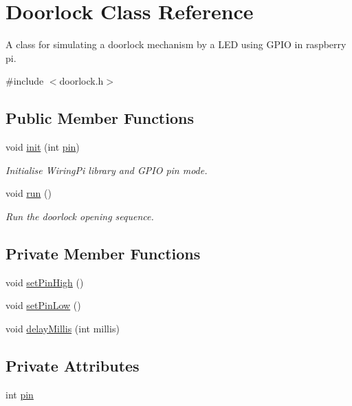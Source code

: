 \hypertarget{class_doorlock}{}\section{Doorlock Class Reference}
\label{class_doorlock}


A class for simulating a doorlock mechanism by a L\+E\+D using G\+P\+I\+O in raspberry pi.  




{\ttfamily \#include $<$doorlock.\+h$>$}

\subsection*{Public Member Functions}
\begin{DoxyCompactItemize}
\item 
void \hyperlink{class_doorlock_afcbd63621433c6086f0356bd2f94b47d}{init} (int \hyperlink{class_doorlock_a47bd9a55d9497c8276026ed0f6ed1bf5}{pin})
\begin{DoxyCompactList}\small\item\em Initialise Wiring\+Pi library and G\+P\+I\+O pin mode. \end{DoxyCompactList}\item 
void \hyperlink{class_doorlock_a673692b6523ede367cb976a345c7abf8}{run} ()
\begin{DoxyCompactList}\small\item\em Run the doorlock opening sequence. \end{DoxyCompactList}\end{DoxyCompactItemize}
\subsection*{Private Member Functions}
\begin{DoxyCompactItemize}
\item 
void \hyperlink{class_doorlock_a03ac589bab28ea38e17bbe0cfdc3cedd}{set\+Pin\+High} ()
\item 
void \hyperlink{class_doorlock_a7479d484eff1b1122c4f9e92f51597d1}{set\+Pin\+Low} ()
\item 
void \hyperlink{class_doorlock_aef174dcae75e99ddcf7c479bc65db2d1}{delay\+Millis} (int millis)
\end{DoxyCompactItemize}
\subsection*{Private Attributes}
\begin{DoxyCompactItemize}
\item 
int \hyperlink{class_doorlock_a47bd9a55d9497c8276026ed0f6ed1bf5}{pin}
\end{DoxyCompactItemize}


